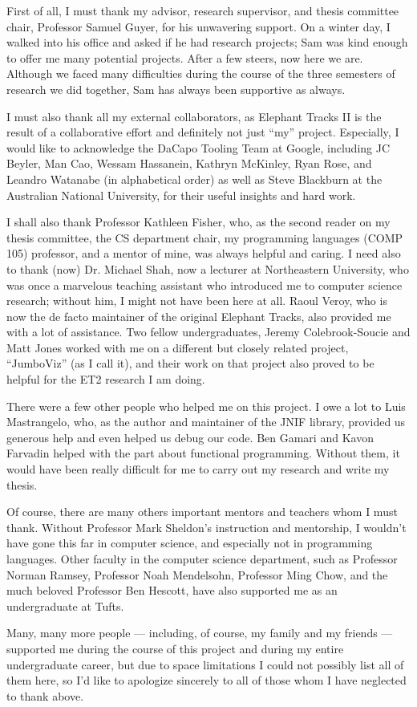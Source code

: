 First of all, I must thank my advisor, research supervisor, and thesis committee chair, Professor Samuel Guyer, for his unwavering
support. On a winter day, I walked into his office and asked if he had research projects; Sam was kind enough to offer me many
potential projects. After a few steers, now here we are. Although we faced many difficulties during the course of the three
semesters of research we did together, Sam has always been supportive as always.

I must also thank all my external collaborators, as Elephant Tracks II is the result of a collaborative effort and definitely not just
``my'' project. Especially, I would like to acknowledge the DaCapo Tooling Team at Google, including JC Beyler, Man Cao, Wessam Hassanein,
Kathryn McKinley, Ryan Rose, and Leandro Watanabe (in alphabetical order) as well as Steve Blackburn at the Australian National
University, for their useful insights and hard work.

I shall also thank Professor Kathleen Fisher, who, as the second reader on my thesis committee, the CS department chair, my programming
languages (COMP 105) professor, and a mentor of mine, was always helpful and caring. I need also to thank (now) Dr. Michael Shah, now
a lecturer at Northeastern University, who was once a marvelous teaching assistant who introduced me to computer science research;
without him, I might not have been here at all. Raoul Veroy, who is now the de facto maintainer of the original Elephant Tracks, also
provided me with a lot of assistance. Two fellow undergraduates, Jeremy Colebrook-Soucie and Matt Jones worked with me
on a different but closely related project, ``JumboViz'' (as I call it), and their work on that project also proved to be helpful
for the ET2 research I am doing.

There were a few other people who helped me on this project. I owe a lot to Luis Mastrangelo, who, as the author and maintainer of the
JNIF library, provided us generous help and even helped us debug our code. Ben Gamari and Kavon Farvadin helped with the part about
functional programming. Without them, it would have been really difficult for me to carry out my research and write my thesis.

Of course, there are many others important mentors and teachers whom I must thank. Without Professor Mark Sheldon's instruction
and mentorship, I wouldn't have gone this far in computer science, and especially not in programming languages. Other faculty
in the computer science department, such as Professor Norman Ramsey, Professor Noah Mendelsohn, Professor Ming Chow, and the
much beloved Professor Ben Hescott, have also supported me as an undergraduate at Tufts.

Many, many more people --- including, of course, my family and my friends --- supported me during the course of this project
and during my entire undergraduate career, but due to space limitations I could not possibly list all of them here, so I'd like to
apologize sincerely to all of those whom I have neglected to thank above. 
